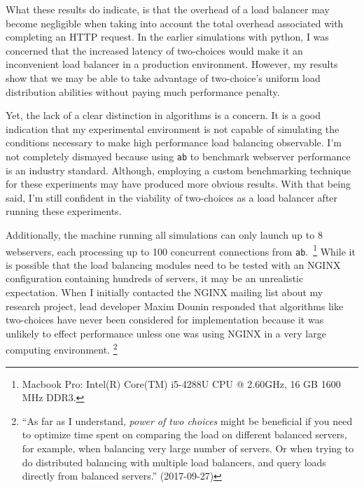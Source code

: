 What these results do indicate, is that the overhead of a load
balancer may become negligible when taking into account the total
overhead associated with completing an HTTP request. In the earlier
simulations with python, I was concerned that the increased latency of
two-choices would make it an inconvenient load balancer in a
production environment. However, my results show that we may be able
to take advantage of two-choice's uniform load distribution abilities
without paying much performance penalty.

Yet, the lack of a clear distinction in algorithms is a concern. It is
a good indication that my experimental environment is not capable of
simulating the conditions necessary to make high performance load
balancing observable. I'm not completely dismayed because using
\texttt{ab} to benchmark webserver performance is an industry
standard. Although, employing a custom benchmarking technique for
these experiments may have produced more obvious results. With that
being said, I'm still confident in the viability of two-choices as a
load balancer after running these experiments.

Additionally, the machine running all simulations can only launch up to 8
webservers, each processing up to 100 concurrent connections from
\texttt{ab}.~\footnote{Macbook Pro: Intel(R) Core(TM) i5-4288U CPU @
  2.60GHz, 16 GB 1600 MHz DDR3.} While it is possible that the load
balancing modules need to be tested with an NGINX configuration
containing hundreds of servers, it may be an unrealistic expectation.
When I initially contacted the NGINX mailing list about my research
project, lead developer Maxim Dounin responded that algorithms like
two-choices have never been considered for implementation because it
was unlikely to effect performance unless one was using NGINX in a
very large computing environment.
\footnote{``As far as I understand, \emph{power of two choices} might
  be beneficial if you need to optimize time spent on comparing the
  load on different balanced servers, for example, when balancing very
  large number of servers. Or when trying to do distributed balancing
  with multiple load balancers, and query loads directly from balanced
  servers.'' (2017-09-27)}


